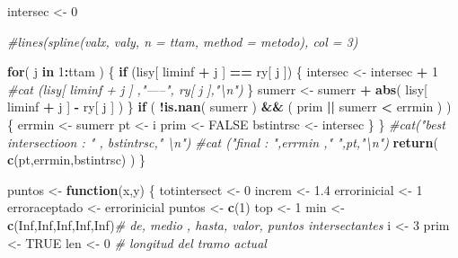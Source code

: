 \documentclass[]{article}
\newenvironment{Shaded}{\begin{snugshade}}{\end{snugshade}}
\newcommand{\KeywordTok}[1]{\textcolor[rgb]{0.13,0.29,0.53}{\textbf{#1}}}
\newcommand{\DecValTok}[1]{\textcolor[rgb]{0.00,0.00,0.81}{#1}}
\newcommand{\FloatTok}[1]{\textcolor[rgb]{0.00,0.00,0.81}{#1}}
\newcommand{\StringTok}[1]{\textcolor[rgb]{0.31,0.60,0.02}{#1}}
\newcommand{\CommentTok}[1]{\textcolor[rgb]{0.56,0.35,0.01}{\textit{#1}}}
\newcommand{\OtherTok}[1]{\textcolor[rgb]{0.56,0.35,0.01}{#1}}
\newcommand{\ControlFlowTok}[1]{\textcolor[rgb]{0.13,0.29,0.53}{\textbf{#1}}}
\newcommand{\OperatorTok}[1]{\textcolor[rgb]{0.81,0.36,0.00}{\textbf{#1}}}
\newcommand{\NormalTok}[1]{#1}
\begin{document}
\begin{Shaded}
\begin{Highlighting}[]
\NormalTok{    intersec <-}\StringTok{ }\DecValTok{0}
    
    \CommentTok{#lines(spline(valx, valy, n = ttam, method = metodo), col = 3)}
    
    \ControlFlowTok{for}\NormalTok{( j }\ControlFlowTok{in} \DecValTok{1}\OperatorTok{:}\NormalTok{ttam )}
\NormalTok{    \{}
      \ControlFlowTok{if}\NormalTok{ (lisy[ liminf }\OperatorTok{+}\StringTok{ }\NormalTok{j ] }\OperatorTok{==}\StringTok{  }\NormalTok{ry[ j ])}
\NormalTok{      \{}
\NormalTok{        intersec <-}\StringTok{ }\NormalTok{intersec }\OperatorTok{+}\StringTok{ }\DecValTok{1}
        \CommentTok{#cat (lisy[ liminf + j ]  ,"-----",  ry[ j ],"\textbackslash{}n")}
\NormalTok{      \}}
\NormalTok{      sumerr <-}\StringTok{ }\NormalTok{sumerr }\OperatorTok{+}\StringTok{ }\KeywordTok{abs}\NormalTok{( lisy[ liminf }\OperatorTok{+}\StringTok{ }\NormalTok{j ] }\OperatorTok{-}\StringTok{  }\NormalTok{ry[ j ] ) }
\NormalTok{    \}}
    \ControlFlowTok{if}\NormalTok{ ( }\OperatorTok{!}\KeywordTok{is.nan}\NormalTok{( sumerr ) }\OperatorTok{&&}\StringTok{ }\NormalTok{( prim }\OperatorTok{||}\StringTok{ }\NormalTok{sumerr }\OperatorTok{<}\StringTok{ }\NormalTok{errmin ) )}
\NormalTok{    \{}
\NormalTok{      errmin <-}\StringTok{ }\NormalTok{sumerr}
\NormalTok{      pt     <-}\StringTok{ }\NormalTok{i }
\NormalTok{      prim   <-}\StringTok{ }\OtherTok{FALSE}
\NormalTok{      bstintrsc <-}\StringTok{ }\NormalTok{intersec}
\NormalTok{    \}}
\NormalTok{  \}}
  \CommentTok{#cat("best intersectioon : " , bstintrsc," \textbackslash{}n")}
  \CommentTok{#cat ("final : ",errmin ,"    ",pt,"\textbackslash{}n")}
  \KeywordTok{return}\NormalTok{( }\KeywordTok{c}\NormalTok{(pt,errmin,bstintrsc) )}
\NormalTok{\}}

\NormalTok{puntos <-}\StringTok{ }\ControlFlowTok{function}\NormalTok{(x,y)}
\NormalTok{\{}
\NormalTok{  totintersect <-}\StringTok{ }\DecValTok{0}
\NormalTok{  increm <-}\StringTok{ }\FloatTok{1.4}
\NormalTok{  errorinicial  <-}\StringTok{ }\DecValTok{1}
\NormalTok{  erroraceptado <-}\StringTok{ }\NormalTok{errorinicial}
\NormalTok{  puntos <-}\StringTok{ }\KeywordTok{c}\NormalTok{(}\DecValTok{1}\NormalTok{)}
\NormalTok{  top    <-}\StringTok{ }\DecValTok{1} 
\NormalTok{  min    <-}\StringTok{ }\KeywordTok{c}\NormalTok{(}\OtherTok{Inf}\NormalTok{,}\OtherTok{Inf}\NormalTok{,}\OtherTok{Inf}\NormalTok{,}\OtherTok{Inf}\NormalTok{,}\OtherTok{Inf}\NormalTok{)}\CommentTok{# de, medio , hasta, valor, puntos intersectantes }
\NormalTok{  i      <-}\StringTok{ }\DecValTok{3}
\NormalTok{  prim   <-}\StringTok{ }\OtherTok{TRUE}
\NormalTok{  len    <-}\StringTok{ }\DecValTok{0} \CommentTok{# longitud del tramo actual }
  

\end{Highlighting}
\end{Shaded}
\end{document}
